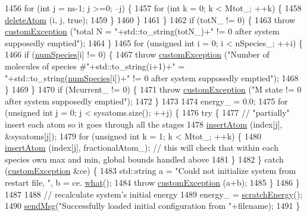 \begin{DoxyCode}
1456         \textcolor{keywordflow}{for} (\textcolor{keywordtype}{int} j = ns-1; j >=0; --j) \{
1457             \textcolor{keywordflow}{for} (\textcolor{keywordtype}{int} k = 0; k < Mtot\_; ++k) \{
1458                 \hyperlink{classsim_system_acabf4fc5b5b90bba62e1449ddb3646c6}{deleteAtom} (i, j, \textcolor{keyword}{true});
1459             \}
1460         \}
1461     \}
1462     \textcolor{keywordflow}{if} (totN\_ != 0) \{
1463         \textcolor{keywordflow}{throw} \hyperlink{classcustom_exception}{customException} (\textcolor{stringliteral}{"total N = "}+std::to\_string(totN\_)+\textcolor{stringliteral}{" != 0 after system
       supposedly emptied"});
1464     \}
1465     \textcolor{keywordflow}{for} (\textcolor{keywordtype}{unsigned} \textcolor{keywordtype}{int} i = 0; i < nSpecies\_; ++i) \{
1466         \textcolor{keywordflow}{if} (\hyperlink{classsim_system_a9eea865e6dc1cff377b1e79c4d9c23f0}{numSpecies}[i] != 0) \{
1467             \textcolor{keywordflow}{throw} \hyperlink{classcustom_exception}{customException} (\textcolor{stringliteral}{"Number of molecules of species #"}+std::to\_string(i+1)+\textcolor{stringliteral}{"
       = "}+std::to\_string(\hyperlink{classsim_system_a9eea865e6dc1cff377b1e79c4d9c23f0}{numSpecies}[i])+\textcolor{stringliteral}{" != 0 after system supposedly emptied"});
1468         \}
1469     \}
1470     \textcolor{keywordflow}{if} (Mcurrent\_ != 0) \{
1471         \textcolor{keywordflow}{throw} \hyperlink{classcustom_exception}{customException} (\textcolor{stringliteral}{"M state != 0 after system supposedly emptied"});
1472     \}
1473 
1474     energy\_ = 0.0;
1475     \textcolor{keywordflow}{for} (\textcolor{keywordtype}{unsigned} \textcolor{keywordtype}{int} j = 0; j < sysatoms.size(); ++j) \{
1476         \textcolor{keywordflow}{try} \{
1477             \textcolor{comment}{// "partially" insert each atom so it goes through all the stages}
1478             \hyperlink{classsim_system_a0404e9435cc046d19b6bb990678ee069}{insertAtom} (index[j], &sysatoms[j]);
1479             \textcolor{keywordflow}{for} (\textcolor{keywordtype}{unsigned} \textcolor{keywordtype}{int} k = 1; k < Mtot\_; ++k) \{
1480                 \hyperlink{classsim_system_a0404e9435cc046d19b6bb990678ee069}{insertAtom} (index[j], fractionalAtom\_); \textcolor{comment}{// this will check that within each
       species own max and min, global bounds handled above}
1481             \}
1482         \} \textcolor{keywordflow}{catch} (\hyperlink{classcustom_exception}{customException} &ce) \{
1483             std::string a = \textcolor{stringliteral}{"Could not initialize system from restart file, "}, b = ce.
      \hyperlink{classcustom_exception_aeb6ab5848b038adfc68fde86a512f691}{what}();
1484             \textcolor{keywordflow}{throw} \hyperlink{classcustom_exception}{customException} (a+b);
1485         \}
1486     \}
1487 
1488     \textcolor{comment}{// recalculate system's initial energy}
1489     energy\_ = \hyperlink{classsim_system_a51539ed4c3bb4905b32ce428c1c537fe}{scratchEnergy}();
1490     \hyperlink{utilities_8cpp_a08974c73a5b36c28b8ad1ef47fca77b0}{sendMsg}(\textcolor{stringliteral}{"Successfully loaded initial configuration from "}+filename);
1491 \}
\end{DoxyCode}
